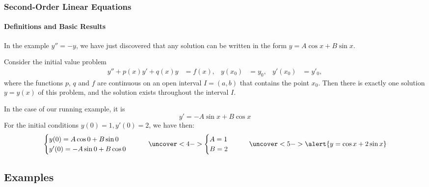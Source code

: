 \documentclass[9pt,xcolor=x11names,compress]{beamer}
\begin{document}
\begin{frame}\frametitle{Second-Order Linear Equations}
\framesubtitle{Definitions and Basic Results}
In the example $y''=-y$, we have just discovered that \alert{any} solution can be written in the form $y=A\cos x + B\sin x$.  
\pause
\begin{theorem}
	Consider the initial value problem
	\begin{align*}
		y''+p(x)y'+q(x)y&=f(x), &y(x_0)&=y_0, &y'(x_0)&=y'_0,
	\end{align*}
	where the functions $p$, $q$ and $f$ are continuous on an open interval $I=(a,b)$ that contains the point $x_0$.  Then there is exactly one solution $y=y(x)$ of this problem, and the solution exists throughout the interval $I$.
\end{theorem}
\pause In the case of our running example, it is
\begin{equation*}
	y'=-A\sin x + B\cos x
\end{equation*}
For the initial conditions $y(0)=1, y'(0)=2$, we have then:
\begin{equation*}
\begin{cases}
	y(0)=A\cos 0 + B\sin 0 \\
	y'(0)=-A\sin 0 + B\cos 0
\end{cases}\qquad
\uncover<4->{
\begin{cases}
A=1\\ B=2
\end{cases}\qquad}
\uncover<5->{\alert{y=\cos x +2 \sin x}}
\end{equation*}
\end{frame}

\subsection{Examples}
\end{document}
